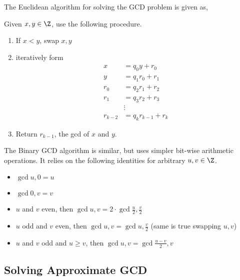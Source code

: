 \documentclass[a4paper,11pt, oneside]{article}
\begin{document}
The Euclidean algorithm for solving the GCD problem is given as,

    Given $x,y\in\Z$, use the following procedure.
    \begin{enumerate}
        \item If $x < y$, swap $x,y$
        \item iteratively form
            \begin{align*}
                x &= q_0y+r_0\\
                y &= q_1r_0 + r_1\\
                r_0 &= q_2r_1 + r_2\\
                r_1 &= q_3r_2 + r_3\\
                &\vdots\\
                r_{k-2} &= q_kr_{k-1} + r_k
            \end{align*}
        \item Return $r_{k-1}$, the gcd of $x$ and $y$.
    \end{enumerate}

The Binary GCD algorithm is similar, but uses simpler bit-wise arithmetic operations.  It relies on the following identities for arbitrary $u,v\in\Z$.
\begin{itemize}
    \item $\gcd{u,0} = u$
    \item $\gcd{0,v} = v$
    \item $u$ and $v$ even, then $\gcd{u,v} = 2\cdot \gcd{\frac{u}{2},\frac{v}{2}}$
    \item $u$ odd and $v$ even, then $\gcd{u,v} = \gcd{u,\frac{v}{2}}$ (same is true swapping $u,v$)
    \item $u$ and $v$ odd and $u\geq v$, then $\gcd{u,v} = \gcd{ \frac{u-v}{2},v}$
\end{itemize}

\subsection{Solving Approximate GCD}
\end{document}
